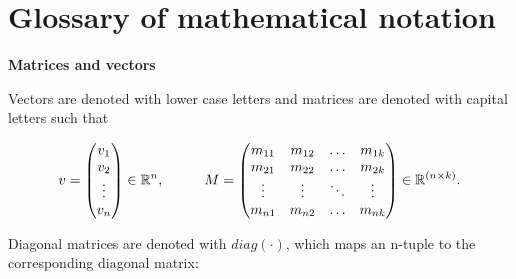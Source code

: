 	


\newpage
\section*{Glossary of mathematical notation}

\textbf{Matrices and vectors}

Vectors are denoted with lower case letters and matrices are denoted with capital letters such that

\vspace{-6mm}
 \begin{equation*}
 v = 
 \begin{pmatrix}

 		 v_1 	\\
		 v_2 	\\
 		 \vdots \\
		 v_n

 \end{pmatrix}
 \in {\mathbb{R}}^{n},
 \hspace{10mm}
 M = 
 \begin{pmatrix}

 		 m_{11} & m_{12} & \hdots & m_{1k}	\\
 		 m_{21} & m_{22} & \hdots & m_{2k}	\\
 		 \vdots & \vdots & \ddots & \vdots	\\
 		 m_{n1} & m_{n2} & \hdots &m_{nk} \\

 \end{pmatrix}
 \in {\mathbb{R}}^{(n \times k)}.
 \end{equation*}

Diagonal matrices are denoted with $diag(\cdot)$, which maps an n-tuple to the corresponding diagonal matrix:
\vspace{-5mm}

